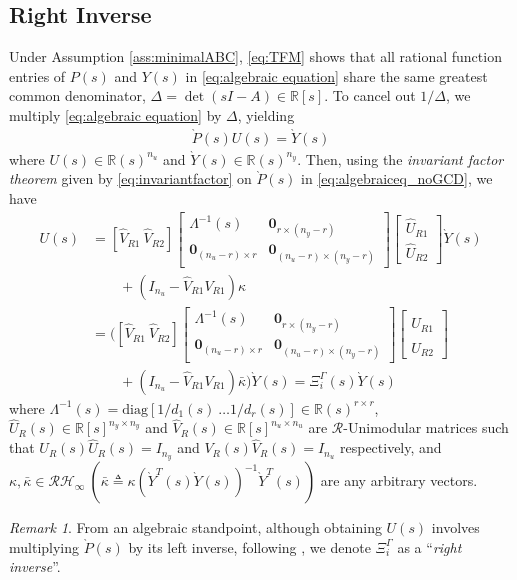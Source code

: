 \documentclass[journal]{IEEEtran}
\theoremstyle{remark}
\newtheorem{remark}{Remark}
\begin{document}
\subsection{{Right Inverse}} \label{sec:leftinverse}
Under Assumption \ref{ass:minimalABC}, \eqref{eq:TFM} shows that all rational function entries of $P(s)$ and $Y(s)$ in \eqref{eq:algebraic equation} share the same greatest common denominator, $\Delta=\det (sI-A) \in \mathbb{R}[s]$. To cancel out $1/\Delta$, we multiply \eqref{eq:algebraic equation} by $\Delta$, yielding 
\begin{align} \label{eq:algebraiceq_noGCD}
    \grave{P}(s)U(s)= \grave{Y}(s)
\end{align}
where $U(s) \in \mathbb{R}(s)^{n_u}$ and $\grave{Y}(s) \in \mathbb{R}(s)^{n_y}$. Then, using the \textit{invariant factor theorem} given by \eqref{eq:invariantfactor} on $\grave{P}(s)$ in \eqref{eq:algebraiceq_noGCD}, we have
\begin{align} \label{eq:leftinverse}
U(s)&=[\hat{V}_{R1} \ \hat{V}_{R2}] \begin{bmatrix}
    \Lambda^{-1}(s) & \textbf{0}_{r \times (n_y-r)}\\
    \textbf{0}_{(n_u-r)\times r} & \textbf{0}_{(n_u-r)\times (n_y-r)}
\end{bmatrix}\begin{bmatrix}
    \hat{U}_{R1} \\
    \hat{U}_{R2}
\end{bmatrix}\grave{Y}(s)\nonumber\\& \qquad +(I_{n_u}-\hat{V}_{R1}{V}_{R1})\kappa \nonumber \\
&=\Biggr( [\hat{V}_{R1} \ \hat{V}_{R2}]  \begin{bmatrix}
    \Lambda^{-1}(s) & \textbf{0}_{r \times (n_y-r)}\\
    \textbf{0}_{(n_u-r)\times r} & \textbf{0}_{(n_u-r)\times (n_y-r)}
\end{bmatrix}\begin{bmatrix}
    \hat{U}_{R1} \\
    \hat{U}_{R2}
\end{bmatrix} \nonumber\\ & \qquad +(I_{n_u}-\hat{V}_{R1}{V}_{R1})\bar{\kappa}  \Biggr)\grave{Y}(s)= \Xi_i^{\Gamma}(s) \grave{Y}(s) 
\end{align}
where $\Lambda^{-1}(s)=\text{diag}[{1}/{d_1(s)} \ \dots {1}/{d_r(s)}] \in \mathbb{R}(s)^{r \times r}$,  $\hat{U}_R(s) \in \mathbb{R}[s]^{n_y \times n_y}$ and $\hat{V}_R(s) \in \mathbb{R}[s]^{n_u \times n_u}$ are $\mathcal{R}$-Unimodular matrices such that  ${U}_R(s)\hat{U}_R(s)=I_{n_y}$ and ${V}_R(s)\hat{V}_R(s)=I_{n_u}$ respectively, and $\kappa, \bar{\kappa} \in \mathcal{R}\mathcal{H}_\infty \  (\bar{\kappa}\triangleq \kappa(\grave{Y}^T(s)\grave{Y}(s))^{-1}\grave{Y}^T(s))$ are any arbitrary vectors. 
{\begin{remark}
From an algebraic standpoint, although obtaining $U(s)$ involves multiplying $\grave{P}(s)$ by its left inverse, following \cite{moylan1977stable,estrada2007left}, we denote $\Xi_i^\Gamma$ as a “\textit{right inverse}”.
\end{remark}}
\end{document}
